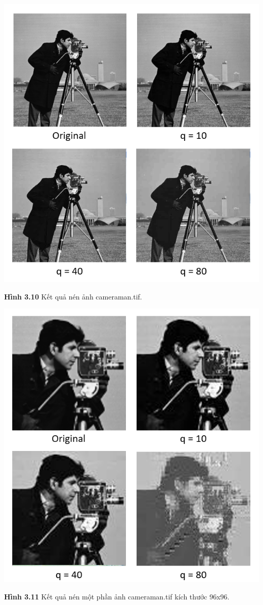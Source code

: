 \begin{center}
    \includegraphics[scale=0.53]{Figures/fig25.png}
    \par \textbf {Hình 3.10} Kết quả nén ảnh cameraman.tif.
\end{center}
\begin{center}
    \includegraphics[scale=0.53]{Figures/fig29.png}
    \par \textbf {Hình 3.11} Kết quả nén một phần ảnh cameraman.tif kích thước 96x96.
\end{center}
